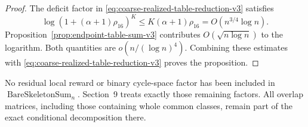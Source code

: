 \begin{proof}
The deficit factor in \eqref{eq:coarse-realized-table-reduction-v3} satisfies
\[
  \log\left(1+(\alpha+1)\rho_{16}\right)^K
  \le
  K(\alpha+1)\rho_{16}
  =O(n^{3/4}\log n).
\]
Proposition~\ref{prop:endpoint-table-sum-v3} contributes
$O(\sqrt{n\log n})$ to the logarithm. Both quantities are
$o(n/(\log n)^4)$. Combining these estimates with
\eqref{eq:coarse-realized-table-reduction-v3} proves the proposition.
\end{proof}

No residual local reward or binary cycle-space factor has been included in
$\operatorname{BareSkeletonSum}_n$. Section~9 treats exactly those remaining
factors. All overlap matrices, including those containing whole common
classes, remain part of the exact conditional decomposition there.
